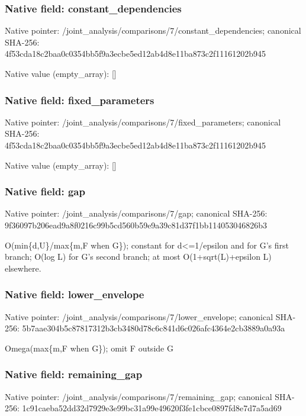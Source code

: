 \documentclass[10pt,a4paper]{article}
\begin{document}
\subsubsection{Native field: constant\_\allowbreak{}dependencies}
Native pointer: /joint\_\allowbreak{}analysis/comparisons/7/constant\_\allowbreak{}dependencies; canonical SHA-256: 4f53cda18c2baa0c0354bb5f9a3ecbe5ed12ab4d8e11ba873c2f11161202b945

Native value (empty\_\allowbreak{}array): []

\subsubsection{Native field: fixed\_\allowbreak{}parameters}
Native pointer: /joint\_\allowbreak{}analysis/comparisons/7/fixed\_\allowbreak{}parameters; canonical SHA-256: 4f53cda18c2baa0c0354bb5f9a3ecbe5ed12ab4d8e11ba873c2f11161202b945

Native value (empty\_\allowbreak{}array): []

\subsubsection{Native field: gap}
Native pointer: /joint\_\allowbreak{}analysis/comparisons/7/gap; canonical SHA-256: 9f36097b206ead9a8f0216c99b5cd560b59e9a39c81d37f1bb114053046826b3

\begingroup\raggedright\sloppy O(min\{d,\allowbreak{}U\}/\allowbreak{}max\{m,\allowbreak{}F when G\});\allowbreak{} constant for d<=\allowbreak{}1/\allowbreak{}epsilon and for G's first branch;\allowbreak{} O(log L) for G's second branch;\allowbreak{} at most O(1+sqrt(L)+epsilon L) elsewhere.\par\endgroup

\subsubsection{Native field: lower\_\allowbreak{}envelope}
Native pointer: /joint\_\allowbreak{}analysis/comparisons/7/lower\_\allowbreak{}envelope; canonical SHA-256: 5b7aae304b5c87817312b3cb3480d78c6c841d6c026afc4364e2cb3889a0a93a

\begingroup\raggedright\sloppy Omega(max\{m,\allowbreak{}F when G\});\allowbreak{} omit F outside G\par\endgroup

\subsubsection{Native field: remaining\_\allowbreak{}gap}
Native pointer: /joint\_\allowbreak{}analysis/comparisons/7/remaining\_\allowbreak{}gap; canonical SHA-256: 1c91caeba52dd32d7929e3e99bc31a99e49620f3fe1cbce0897fd8e7d7a5ad69
\end{document}
